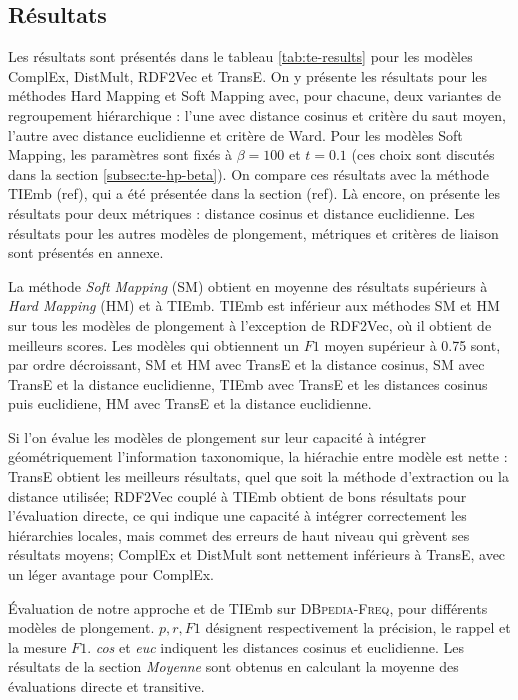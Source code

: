 \subsection{Résultats}
\label{subsec:te-results}

Les résultats sont présentés dans le tableau \ref{tab:te-results} pour les modèles ComplEx, DistMult, RDF2Vec et TransE. On y présente les résultats pour les méthodes Hard Mapping et Soft Mapping avec, pour chacune, deux variantes de regroupement hiérarchique : l'une avec distance cosinus et critère du saut moyen, l'autre avec distance euclidienne et critère de Ward. Pour les modèles Soft Mapping, les paramètres sont fixés à $\beta = 100$ et $t=0.1$ (ces choix sont discutés dans la section \ref{subsec:te-hp-beta}). On compare ces résultats avec la méthode TIEmb (ref), qui a été présentée dans la section (ref). Là encore, on présente les résultats pour deux métriques : distance cosinus et distance euclidienne. Les résultats pour les autres modèles de plongement, métriques et critères de liaison sont présentés en annexe.

La méthode \textit{Soft Mapping} (SM) obtient en moyenne des résultats supérieurs à \textit{Hard Mapping} (HM) et à TIEmb. TIEmb est inférieur aux méthodes SM et HM sur tous les modèles de plongement à l'exception de RDF2Vec, où il obtient de meilleurs scores. Les modèles qui obtiennent un $F1$ moyen supérieur à 0.75 sont, par ordre décroissant, SM et HM avec TransE et la distance cosinus, SM avec TransE et la distance euclidienne, TIEmb avec TransE et les distances cosinus puis euclidiene, HM avec TransE et la distance euclidienne. 


Si l'on évalue les modèles de plongement sur leur capacité à intégrer géométriquement l'information taxonomique, la hiérachie entre modèle est nette : TransE obtient les meilleurs résultats, quel que soit la méthode d'extraction ou la distance utilisée; RDF2Vec couplé à TIEmb obtient de bons résultats pour l'évaluation directe, ce qui indique une capacité à intégrer correctement les hiérarchies locales, mais commet des erreurs de haut niveau qui grèvent ses résultats moyens; ComplEx et DistMult sont nettement inférieurs à TransE, avec un léger avantage pour ComplEx.


\begin{table}
    \centering
    \caption[Évaluation de trois méthodes d'extraction de taxonomie]{
    Évaluation de notre approche et de TIEmb sur \textsc{DBpedia-Freq}, pour différents modèles de plongement. $p, r, F1$ désignent respectivement la précision, le rappel et la mesure $F1$. \textit{cos} et \textit{euc} indiquent les distances cosinus et euclidienne. Les résultats de la section \textit{Moyenne} sont obtenus en calculant la moyenne des évaluations directe et transitive.}
    \begin{adjustwidth}{-1in}{-1in}
        \begin{center}
            
            \label{tab:te-results} 
        \end{center}
    \end{adjustwidth}
\end{table}

